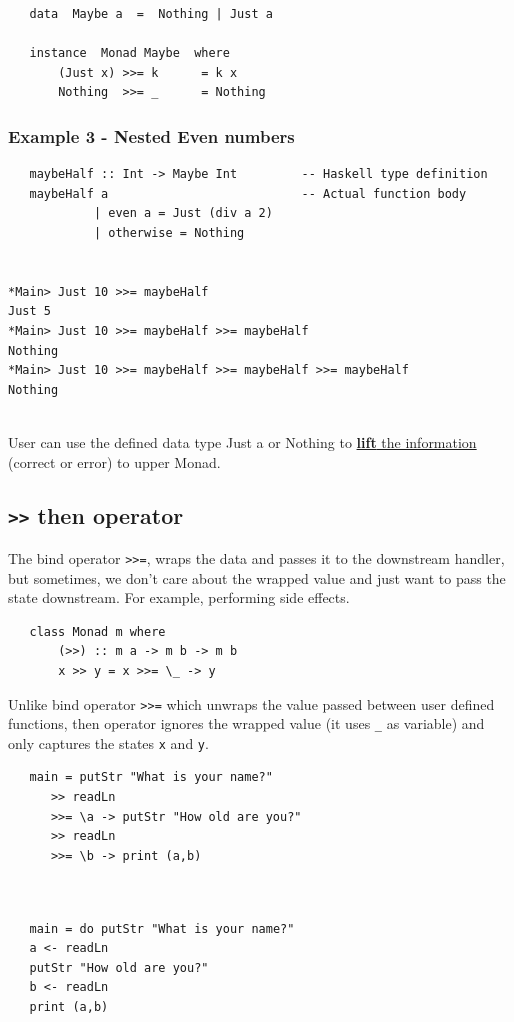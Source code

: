 \begin{lstlisting}
   data  Maybe a  =  Nothing | Just a

   instance  Monad Maybe  where
       (Just x) >>= k      = k x
       Nothing  >>= _      = Nothing   
\end{lstlisting}

\subsubsection{Example 3 - Nested Even numbers}
\begin{lstlisting}
   maybeHalf :: Int -> Maybe Int         -- Haskell type definition
   maybeHalf a                           -- Actual function body
            | even a = Just (div a 2)
            | otherwise = Nothing


*Main> Just 10 >>= maybeHalf
Just 5
*Main> Just 10 >>= maybeHalf >>= maybeHalf
Nothing
*Main> Just 10 >>= maybeHalf >>= maybeHalf >>= maybeHalf
Nothing
            
\end{lstlisting}

User can use the defined data type Just a or Nothing to \ul{\textbf{lift} the information} (correct or error) to upper Monad.

\subsection{\texttt{>>} then operator}

The bind operator \texttt{>>=}, wraps the data and passes it to the downstream handler, but sometimes, we don't care about the wrapped value and just want to pass the state downstream. For example, performing side effects.

\begin{lstlisting}
   class Monad m where
       (>>) :: m a -> m b -> m b
       x >> y = x >>= \_ -> y   
\end{lstlisting}

Unlike bind operator \lstinline|>>=| which unwraps the value passed between user defined functions, then operator ignores the wrapped value (it uses \lstinline|_| as variable) and only captures the states \lstinline|x| and \lstinline|y|.

\begin{paracol}{2}
   
   \begin{lstlisting}
   main = putStr "What is your name?"
      >> readLn
      >>= \a -> putStr "How old are you?"
      >> readLn
      >>= \b -> print (a,b)
      
   \end{lstlisting}
   
   \switchcolumn
\begin{lstlisting}
   
   main = do putStr "What is your name?"
   a <- readLn
   putStr "How old are you?"
   b <- readLn
   print (a,b)
\end{lstlisting}
   
\end{paracol}

